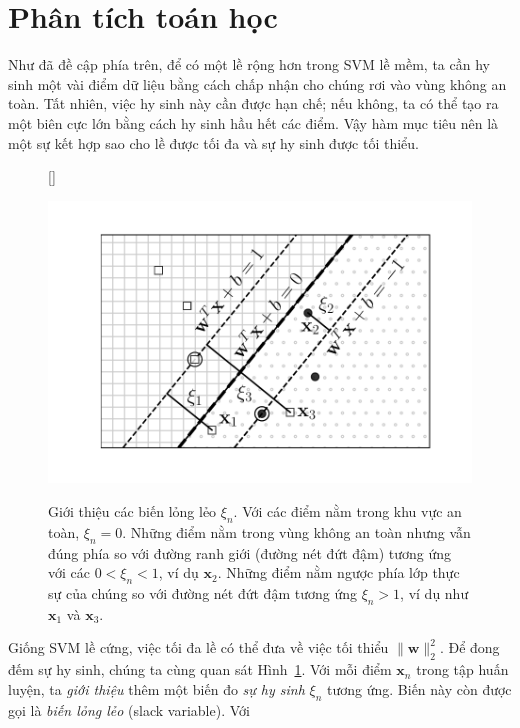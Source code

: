 

\section{Phân tích toán học}

Như đã đề cập phía trên, để có một lề rộng hơn trong SVM lề mềm, ta cần {hy sinh} một vài điểm dữ liệu bằng cách chấp nhận
cho chúng rơi vào vùng {không an toàn}. Tất nhiên, việc {hy sinh}
này cần được hạn chế; nếu không, ta có thể tạo ra một biên cực lớn bằng cách
{hy sinh} hầu hết các điểm. Vậy hàm mục tiêu nên là một sự kết hợp sao cho lề được tối đa và sự hy sinh được tối thiểu.

\begin{figure}[t]
[\FBwidth]
{\caption{
Giới thiệu các biến lỏng lẻo $\xi_n$. Với các điểm nằm trong {khu vực an
toàn}, $\xi_n = 0$.
Những điểm nằm trong vùng
không an toàn nhưng vẫn đúng phía so với đường ranh giới (đường nét đứt
đậm) tương ứng với các $0 < \xi_n < 1$, ví dụ $\mathbf{x}_2$. Những điểm
nằm ngược phía lớp thực sự của chúng so với đường nét đứt đậm tương ứng $\xi_n > 1$, ví dụ như $\mathbf{x}_1$ và $\mathbf{x}_3$.
}
\label{fig:20_2}}
{ %
\includegraphics[width=.55\textwidth]{ebookML_src/src/softmargin_svm/ssvm3.pdf}
}
\end{figure}
Giống SVM lề cứng, việc tối đa lề có thể đưa
về việc tối thiểu $\|\mathbf{w}\|_2^2$. Để đong đếm sự hy sinh, chúng ta cùng quan sát Hình~\ref{fig:20_2}. Với mỗi điểm $\mathbf{x}_n$ trong tập huấn luyện, ta \textit{giới thiệu} thêm một biến đo \textit{sự hy
sinh} $\xi_n$ tương ứng. Biến này còn được gọi là \textit{biến lỏng lẻo} (slack variable). Với
